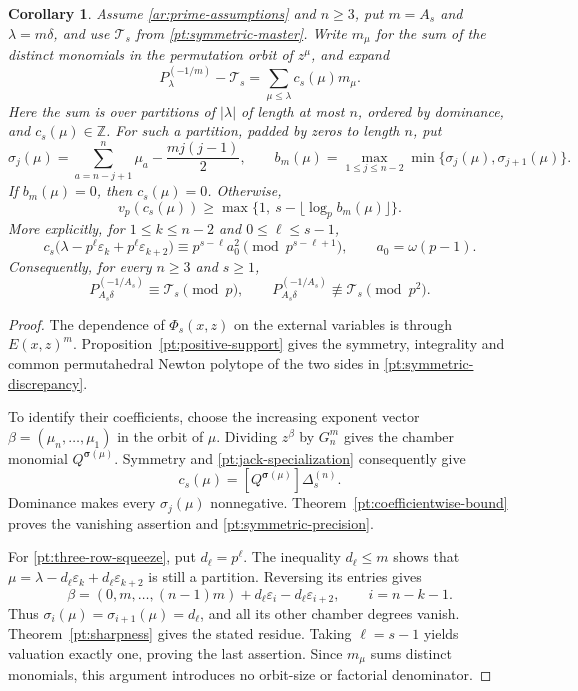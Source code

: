 \documentclass[11pt]{amsart}
\newtheorem{corollary}[theorem]{Corollary}
\theoremstyle{definition}
\theoremstyle{remark}
\numberwithin{equation}{section}
\newcommand{\Z}{\mathbb Z}
\begin{document}
\begin{corollary}\label{pt:symmetric-comparison}
Assume \eqref{ar:prime-assumptions} and $n\geq3$, put $m=A_s$ and
$\lambda=m\delta$, and use $\mathcal T_s$ from \eqref{pt:symmetric-master}.
Write $m_\mu$ for the sum of the distinct
monomials in the permutation orbit of $z^\mu$, and expand
\begin{equation}\label{pt:symmetric-discrepancy}
 P_\lambda^{(-1/m)}-\mathcal T_s
 =\sum_{\mu\leq\lambda}c_s(\mu)m_\mu.
\end{equation}
Here the sum is over partitions of $|\lambda|$ of length at
most $n$, ordered by dominance, and $c_s(\mu)\in\Z$.
For such a partition, padded by zeros to length $n$, put
\[
 \sigma_j(\mu)
 =\sum_{a=n-j+1}^n\mu_a-\frac{mj(j-1)}2,
 \qquad
 b_m(\mu)=\max_{1\leq j\leq n-2}
                 \min\{\sigma_j(\mu),\sigma_{j+1}(\mu)\}.
\]
If $b_m(\mu)=0$, then $c_s(\mu)=0$. Otherwise,
\begin{equation}\label{pt:symmetric-precision}
 v_p(c_s(\mu))\geq
 \max\{1,\ s-\lfloor\log_pb_m(\mu)\rfloor\}.
\end{equation}
More explicitly, for $1\leq k\leq n-2$ and $0\leq\ell\leq s-1$,
\begin{equation}\label{pt:three-row-squeeze}
 c_s\bigl(\lambda-p^\ell\varepsilon_k+p^\ell\varepsilon_{k+2}\bigr)
 \equiv p^{s-\ell}a_0^2\pmod{p^{s-\ell+1}},
 \qquad a_0=\omega(p-1).
\end{equation}
Consequently, for every $n\geq3$ and $s\geq1$,
\[
 P_{A_s\delta}^{(-1/A_s)}\equiv\mathcal T_s\pmod p,
 \qquad
 P_{A_s\delta}^{(-1/A_s)}\not\equiv\mathcal T_s\pmod{p^2}.
\]
\end{corollary}

\begin{proof}
The dependence of $\Phi_s(x,z)$ on the external variables is
through $E(x,z)^m$. Proposition~\ref{pt:positive-support}
gives the symmetry, integrality and common permutahedral Newton
polytope
of the two sides in \eqref{pt:symmetric-discrepancy}.

To identify their coefficients, choose the increasing exponent
vector $\beta=(\mu_n,\ldots,\mu_1)$ in the orbit of $\mu$.
Dividing $z^\beta$ by $G_n^m$ gives the chamber monomial
$Q^{\boldsymbol\sigma(\mu)}$. Symmetry and
\eqref{pt:jack-specialization} consequently give
\[
 c_s(\mu)
 =[Q^{\boldsymbol\sigma(\mu)}]\Delta_s^{(n)}.
\]
Dominance makes every $\sigma_j(\mu)$ nonnegative.
Theorem~\ref{pt:coefficientwise-bound} proves the vanishing
assertion and \eqref{pt:symmetric-precision}.

For \eqref{pt:three-row-squeeze}, put $d_\ell=p^\ell$.
The inequality $d_\ell\leq m$ shows that
$\mu=\lambda-d_\ell\varepsilon_k+d_\ell\varepsilon_{k+2}$
is still a partition. Reversing its entries gives
\[
 \beta=(0,m,\ldots,(n-1)m)
       +d_\ell\varepsilon_i-d_\ell\varepsilon_{i+2},
 \qquad i=n-k-1.
\]
Thus $\sigma_i(\mu)=\sigma_{i+1}(\mu)=d_\ell$, and all its
other chamber degrees vanish.
Theorem~\ref{pt:sharpness} gives the stated residue.
Taking $\ell=s-1$ yields valuation exactly one, proving the
last assertion. Since $m_\mu$ sums distinct monomials, this
argument introduces no orbit-size or factorial denominator.
\end{proof}
\end{document}
